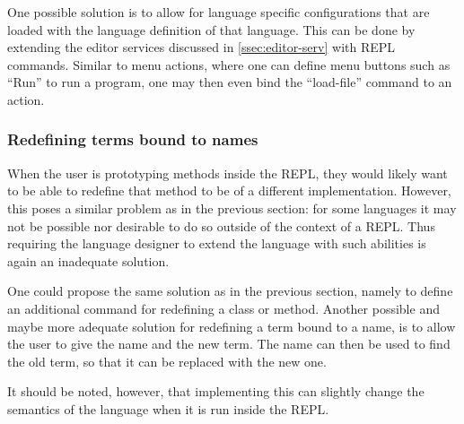 One possible solution is to allow for language specific configurations
that are loaded with the language definition of that language. This
can be done by extending the editor services discussed in
\cref{ssec:editor-serv} with REPL commands. Similar to menu actions,
where one can define menu buttons such as ``Run'' to run a program, one may
then even bind the ``load-file'' command to an action.

\subsubsection{Redefining terms bound to names}
\label{sec:redef-cont-bound}
When the user is prototyping methods inside the REPL, they would
likely want to be able to redefine that method to be of a different
implementation. However, this poses a similar problem as in the
previous section: for some languages it may not be possible nor
desirable to do so outside of the context of a REPL. Thus requiring
the language designer to extend the language with such abilities is
again an inadequate solution.

One could propose the same solution as in the previous section, namely to
define an additional command for redefining a class or method. Another possible
and maybe more adequate solution for redefining a term bound to a name, is to
allow the user to give the name and the new term. The name can then be used to
find the old term, so that it can be replaced with the new one.

It should be noted, however, that implementing this can slightly change the
semantics of the language when it is run inside the REPL.

